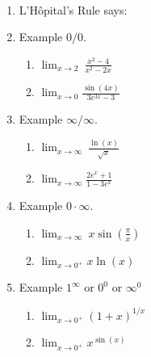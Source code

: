 \documentclass[11pt,fleqn]{article}
\begin{document}
\vspace*{-0.7in}

\begin{center}
  \Large{}\\
\end{center}
\begin{enumerate}
\item  L'H\^{o}pital's Rule says: 
\vspace{2in}
\item Example $0/0.$
	\begin{enumerate}
	\item $\displaystyle{\lim_{x\to 2}\: \frac{x^2-4}{x^2-2x}}$\\
	\vfill
	\item $\displaystyle{\lim_{x \to 0} \frac{\sin(4x)}{3e^{3x}-3}}$
		\vfill
	\end{enumerate}
\item Example $\infty/\infty.$
	\begin{enumerate}
	\item $\displaystyle{\lim_{x\to \infty}\: \frac{\ln(x)}{\sqrt{x}}}$\\
		\vfill
	\item $\displaystyle{\lim_{x \to \infty} \frac{2e^x+1}{1-3e^x}}$\\
	\vfill
	\end{enumerate}
\newpage
\item Example $0 \cdot \infty.$
	\begin{enumerate}
	\item $\displaystyle{\lim_{x\to \infty}\: x \sin(\frac{\pi}{x})}$\\
	\vfill
	\item $\displaystyle \lim_{x \to 0^+} x \ln (x)$
	\vfill
	\end{enumerate}
\item Example $1^\infty$ or $0^0$ or $\infty^0$
	\begin{enumerate}
	\item  $\displaystyle{\lim_{x\to 0^+} \left(1+x \right)^{1/x}}$\\
	\vfill
	\item $\displaystyle \lim_{x \to 0^+} x^{\sin(x)}$
	\vfill
	\end{enumerate}
	
\end{enumerate}
\end{document}
